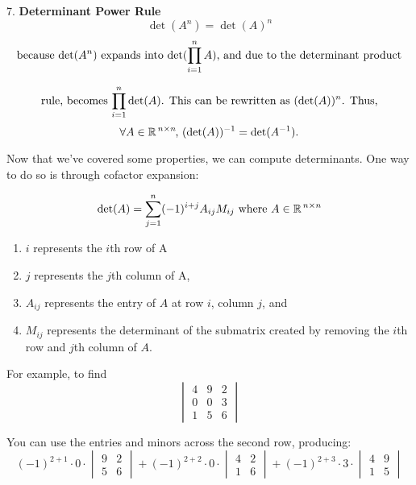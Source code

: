 \documentclass{article}
\begin{document}
\vspace{2mm}

7. \textbf{Determinant Power Rule}
\[
\text{$\det(A^n) = \det(A)^n$}
\]
\[
\text{because $\det(A^n)$ expands into $\det(\prod_{i=1}^n A)$, and due to the determinant product}
\vspace{1mm}
\]

\[
\text{rule, becomes $\prod_{i=1}^n \det(A)$. This can be rewritten as $(\det(A))^n$. Thus,}
\vspace{2mm}
\]
\[
\text{$\forall A \in \mathbb{R}^{\hspace{0.5mm}n \times n}$ \hspace{-1.5mm}, $(\det(A))^{-1} = \det(A^{-1})$.}
\vspace{4mm}
\]

Now that we've covered some properties, we can compute determinants. One way to do so is through cofactor expansion:

\[
\text{$\det(A) = \sum_{j=1}^{n} (-1)^{i+j} A_{ij} M_{ij}$ where $A \in \mathbb{R}^{\hspace{0.5mm}n \times n}$}
\]

\begin{enumerate}
    \item \(i\) represents the \(i\)th row of A
    \item \(j\) represents the \(j\)th column of A,
    \item \(A_{ij}\) represents the entry of \(A\) at row \(i\), column \(j\), and
    \item \(M_{ij}\) represents the determinant of the submatrix created by removing the \(i\)th row and \(j\)th column of \(A\).
\end{enumerate}

For example, to find
\[
\begin{vmatrix}
4 & 9 & 2 \\
0 & 0 & 3 \\
1 & 5 & 6
\end{vmatrix}
\]

You can use the entries and minors across the second row, producing:
\[
(-1)^{2+1} \cdot 0 \cdot \begin{vmatrix} 9 & 2 \\ 5 & 6 \end{vmatrix} + (-1)^{2+2} \cdot 0 \cdot \begin{vmatrix} 4 & 2 \\ 1 & 6 \end{vmatrix} + (-1)^{2+3} \cdot 3 \cdot \begin{vmatrix} 4 & 9 \\ 1 & 5 \end{vmatrix}
\]
\end{document}
